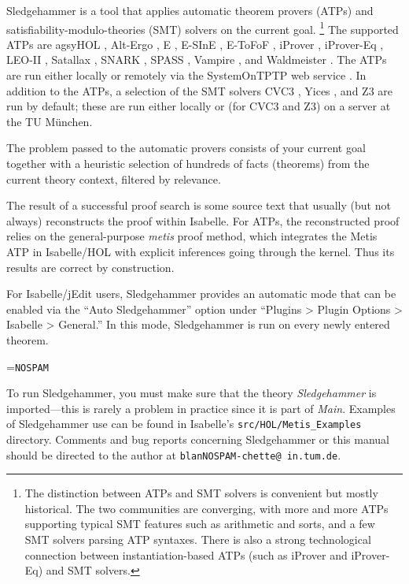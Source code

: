 \documentclass[a4paper,12pt]{article}
\begin{document}
Sledgehammer is a tool that applies automatic theorem provers (ATPs)
and satisfiability-modulo-theories (SMT) solvers on the current goal.%
\footnote{The distinction between ATPs and SMT solvers is convenient but mostly
historical. The two communities are converging, with more and more ATPs
supporting typical SMT features such as arithmetic and sorts, and a few SMT
solvers parsing ATP syntaxes. There is also a strong technological connection
between instantiation-based ATPs (such as iProver and iProver-Eq) and SMT
solvers.}
%
The supported ATPs are agsyHOL \cite{agsyHOL}, Alt-Ergo \cite{alt-ergo}, E
\cite{schulz-2002}, E-SInE \cite{sine}, E-ToFoF \cite{tofof}, iProver
\cite{korovin-2009}, iProver-Eq \cite{korovin-sticksel-2010}, LEO-II
\cite{leo2}, Satallax \cite{satallax}, SNARK \cite{snark}, SPASS
\cite{weidenbach-et-al-2009}, Vampire \cite{riazanov-voronkov-2002}, and
Waldmeister \cite{waldmeister}. The ATPs are run either locally or remotely via
the System\-On\-TPTP web service \cite{sutcliffe-2000}. In addition to the ATPs,
a selection of the SMT solvers CVC3 \cite{cvc3}, Yices \cite{yices}, and Z3
\cite{z3} are run by default; these are run either locally or (for CVC3 and Z3)
on a server at the TU M\"unchen.

The problem passed to the automatic provers consists of your current goal
together with a heuristic selection of hundreds of facts (theorems) from the
current theory context, filtered by relevance.

The result of a successful proof search is some source text that usually (but
not always) reconstructs the proof within Isabelle. For ATPs, the reconstructed
proof relies on the general-purpose \textit{metis} proof method, which
integrates the Metis ATP in Isabelle/HOL with explicit inferences going through
the kernel. Thus its results are correct by construction.

For Isabelle/jEdit users, Sledgehammer provides an automatic mode that can be
enabled via the ``Auto Sledgehammer'' option under ``Plugins > Plugin Options >
Isabelle > General.'' In this mode, Sledgehammer is run on every newly entered
theorem.

\newbox\boxA
\setbox\boxA=\hbox{\texttt{NOSPAM}}

\newcommand\authoremail{\texttt{blan{\color{white}NOSPAM}\kern-\wd\boxA{}chette@\allowbreak
in.\allowbreak tum.\allowbreak de}}

To run Sledgehammer, you must make sure that the theory \textit{Sledgehammer} is
imported---this is rarely a problem in practice since it is part of
\textit{Main}. Examples of Sledgehammer use can be found in Isabelle's
\texttt{src/HOL/Metis\_Examples} directory.
Comments and bug reports concerning Sledgehammer or this manual should be
directed to the author at \authoremail.
\end{document}
